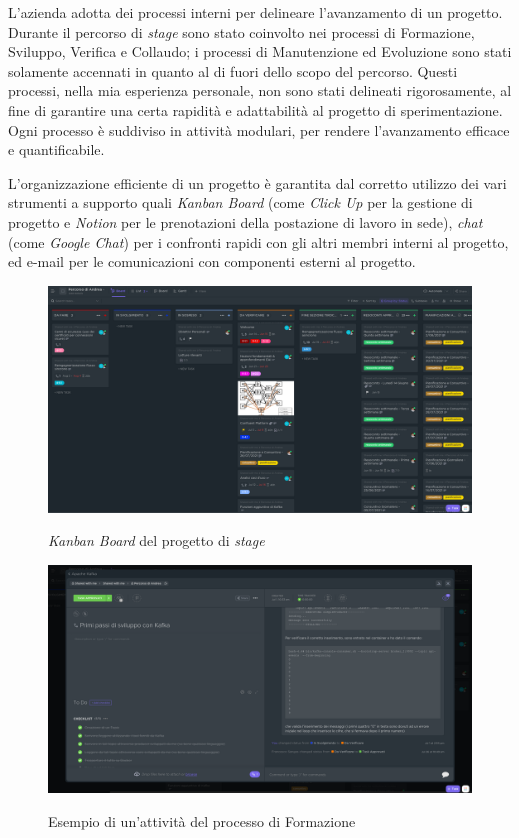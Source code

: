 
L'azienda adotta dei processi interni per delineare l'avanzamento di un progetto.
Durante il percorso di \textit{stage} sono stato coinvolto nei processi di Formazione, Sviluppo, Verifica e Collaudo; i processi di Manutenzione ed Evoluzione sono stati solamente accennati in quanto al di fuori dello scopo del percorso.
Questi processi, nella mia esperienza personale, non sono stati delineati rigorosamente, al fine di garantire una certa rapidità e adattabilità al progetto di sperimentazione.
Ogni processo è suddiviso in attività modulari, per rendere l'avanzamento efficace e quantificabile.

L'organizzazione efficiente di un progetto è garantita dal corretto utilizzo dei vari strumenti a supporto quali \textit{Kanban Board} (come \textit{Click Up} per la gestione di progetto e \textit{Notion} per le prenotazioni della postazione di lavoro in sede), \textit{chat} (come \textit{Google Chat}) per i confronti rapidi con gli altri membri interni al progetto, ed e-mail per le comunicazioni con componenti esterni al progetto.

\begin{figure}[h]
  \includegraphics[width=\textwidth]{images/clickup_board.png}\\
  \caption{\textit{Kanban Board} del progetto di \textit{stage}}
\end{figure}
\begin{figure}[h!]
  \includegraphics[width=\textwidth]{images/clickup_task.png}\\
  \caption{Esempio di un'attività del processo di Formazione}
\end{figure}

